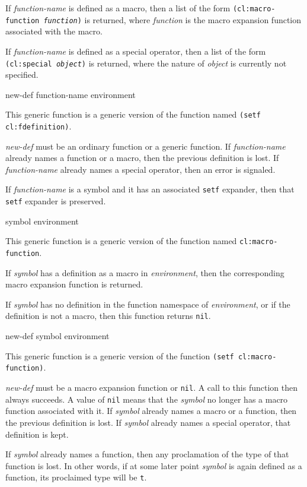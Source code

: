 If \textit{function-name} is defined as a macro, then a list of the form
\texttt{(cl:macro-function \textrm{\textit{function}})} is returned, where
\textit{function} is the macro expansion function associated with the
macro.

If \textit{function-name} is defined as a special operator, then a
list of the form \texttt{(cl:special \textrm{\textit{object}})} is
returned, where the nature of \textit{object} is currently not
specified.

 {new-def function-name environment}

This generic function is a generic version of the \commonlisp{}
function named \texttt{(setf cl:fdefinition)}.

\textit{new-def} must be an ordinary function or a generic function.
If \textit{function-name} already names a function or a macro, then
the previous definition is lost.  If \textit{function-name} already
names a special operator, then an error is signaled.

If \textit{function-name} is a symbol and it has an associated
\texttt{setf} expander, then that \texttt{setf} expander is preserved.

 {symbol environment}

This generic function is a generic version of the \commonlisp{}
function named \texttt{cl:macro-function}.

If \textit{symbol} has a definition as a macro in
\textit{environment}, then the corresponding macro expansion function
is returned.

If \textit{symbol} has no definition in the function namespace of
\textit{environment}, or if the definition is not a macro, then this
function returns \texttt{nil}.

 {new-def symbol environment}

This generic function is a generic version of the \commonlisp{}
function \texttt{(setf cl:macro-function)}.

\textit{new-def} must be a macro expansion function or \texttt{nil}.
A call to this function then always succeeds.  A value of \texttt{nil}
means that the \textit{symbol} no longer has a macro function
associated with it.  If \textit{symbol} already names a macro or a
function, then the previous definition is lost.  If \textit{symbol}
already names a special operator, that definition is kept.

If \textit{symbol} already names a function, then any proclamation of
the type of that function is lost.  In other words, if at some later
point \textit{symbol} is again defined as a function, its proclaimed
type will be \texttt{t}.

